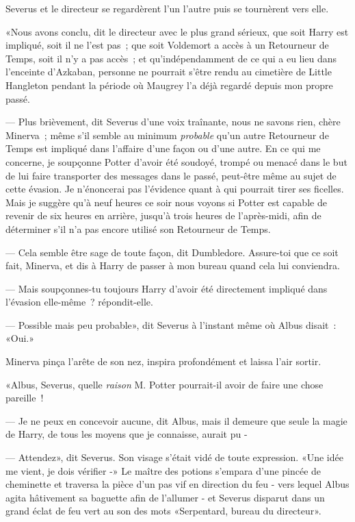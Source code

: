Severus et le directeur se regardèrent l'un l'autre puis se tournèrent vers elle.

«Nous avons conclu, dit le directeur avec le plus grand sérieux, que soit Harry est impliqué, soit il ne l'est pas~; que soit Voldemort a accès à un Retourneur de Temps, soit il n'y a pas accès~; et qu'indépendamment de ce qui a eu lieu dans l'enceinte d'Azkaban, personne ne pourrait s'être rendu au cimetière de Little Hangleton pendant la période où Maugrey l'a déjà regardé depuis mon propre passé.

--- Plus brièvement, dit Severus d'une voix traînante, nous ne savons rien, chère Minerva~; même s'il semble au minimum \emph{probable} qu'un autre Retourneur de Temps est impliqué dans l'affaire d'une façon ou d'une autre. En ce qui me concerne, je soupçonne Potter d'avoir été soudoyé, trompé ou menacé dans le but de lui faire transporter des messages dans le passé, peut-être même au sujet de cette évasion. Je n'énoncerai pas l'évidence quant à qui pourrait tirer ses ficelles. Mais je suggère qu'à neuf heures ce soir nous voyons si Potter est capable de revenir de six heures en arrière, jusqu'à trois heures de l'après-midi, afin de déterminer s'il n'a pas encore utilisé son Retourneur de Temps.

--- Cela semble être sage de toute façon, dit Dumbledore. Assure-toi que ce soit fait, Minerva, et dis à Harry de passer à mon bureau quand cela lui conviendra.

--- Mais soupçonnes-tu toujours Harry d'avoir été directement impliqué dans l'évasion elle-même~? répondit-elle.

--- Possible mais peu probable», dit Severus à l'instant même où Albus disait~: «Oui.»

Minerva pinça l'arête de son nez, inspira profondément et laissa l'air sortir.

«Albus, Severus, quelle \emph{raison} M. Potter pourrait-il avoir de faire une chose pareille~!

--- Je ne peux en concevoir aucune, dit Albus, mais il demeure que seule la magie de Harry, de tous les moyens que je connaisse, aurait pu -

--- Attendez», dit Severus. Son visage s'était vidé de toute expression. «Une idée me vient, je dois vérifier -» Le maître des potions s'empara d'une pincée de cheminette et traversa la pièce d'un pas vif en direction du feu - vers lequel Albus agita hâtivement sa baguette afin de l'allumer - et Severus disparut dans un grand éclat de feu vert au son des mots «Serpentard, bureau du directeur».

